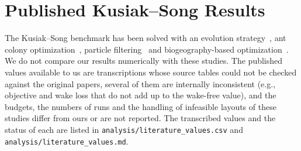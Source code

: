 \documentclass[10pt]{article}
\begin{document}
\section{Published Kusiak--Song Results}
\label{sec:S-literature}
The Kusiak--Song benchmark has been solved with an evolution strategy~\cite{Kusiak2010}, ant colony optimization~\cite{Eroglu2012}, particle filtering~\cite{Eroglu2013} and biogeography-based optimization~\cite{Bansal2017}. We do not compare our results numerically with these studies. The published values available to us are transcriptions whose source tables could not be checked against the original papers, several of them are internally inconsistent (e.g., objective and wake loss that do not add up to the wake-free value), and the budgets, the numbers of runs and the handling of infeasible layouts of these studies differ from ours or are not reported. The transcribed values and the status of each are listed in \texttt{analysis/literature\_values.csv} and \texttt{analysis/literature\_values.md}.
\end{document}
